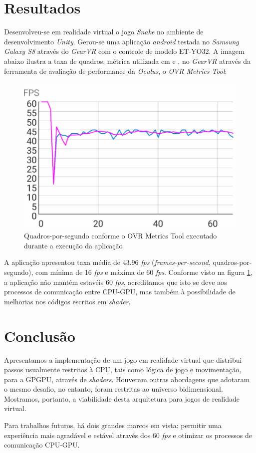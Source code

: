\documentclass[conference]{IEEEtran}
\begin{document}
\section{Resultados} \label{sec:results}
Desenvolveu-se em realidade virtual o jogo \textit{Snake} no ambiente de desenvolvimento \textit{Unity}. Gerou-se uma aplicação \textit{android} testada no \textit{Samsung Galaxy S8} através do \textit{GearVR} com o controle de modelo ET-YO32. A imagem abaixo ilustra a taxa de quadros, métrica utilizada em \cite{GPGPUWars} e \cite{GPGPUTechniques}, no \textit{GearVR} através da ferramenta de avaliação de performance da \textit{Oculus}, o \textit{OVR Metrics Tool}:

\begin{figure}[H] 
\centering
\includegraphics[scale=0.5]{VRPerformance}
\caption{Quadros-por-segundo conforme o OVR Metrics Tool executado durante a execução da aplicação} \label{fig:VRPerformance}
\end{figure}

A aplicação apresentou taxa média de 43.96 \textit{fps} (\textit{frames-per-second}, quadros-por-segundo), com mínima de 16 \textit{fps} e máxima de 60 \textit{fps}. Conforme visto na figura \ref{fig:VRPerformance}, a aplicação não mantém estavéis 60 \textit{fps}, acreditamos que isto se deve aos processos de comunicação entre CPU-GPU, mas também à possíbilidade de melhorias nos códigos escritos em \textit{shader}.

\section{Conclusão}\label{sec:conclusion}
Apresentamos a implementação de um jogo em realidade virtual que distribui passos usualmente restritos à CPU, tais como lógica de jogo e movimentação, para a GPGPU, através de \textit{shaders}. Houveram outras abordagens que adotaram o mesmo desafio, no entanto, foram restritas ao universo bidimensional. Mostramos, portanto, a viabilidade desta arquitetura para jogos de realidade virtual.

Para trabalhos futuros, há dois grandes marcos em vista: permitir uma experiência mais agradável e estável através dos 60 \textit{fps} e otimizar os processos de comunicação CPU-GPU.




\end{document}
